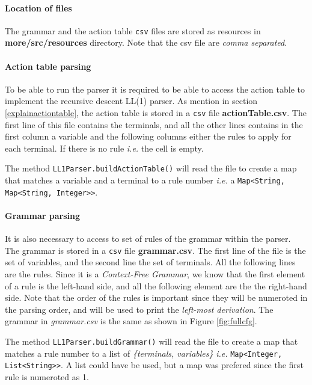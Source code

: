 \documentclass[letterpaper]{article}
\begin{document}
\paragraph{Location of files}
The grammar and the action table \texttt{csv} files are stored
as resources in
\textbf{more/src/resources} directory.
Note that the csv file are \textit{comma separated}.

\paragraph{Action table parsing}
To be able to run the parser it is required to be able to access
the action table to implement
the recursive descent LL(1) parser.
As mention in section \ref{explainactiontable}, the action table is stored
in a \texttt{csv} file \textbf{actionTable.csv}.
The first line of this file contains the
terminals, and all the other lines contains in the first column a variable
and the following columns either the rules to apply for each terminal.
If there is no rule \textit{i.e.} the cell is empty.

The method \texttt{LL1Parser.buildActionTable()} will read the file
to create a map that matches a variable and a terminal to a rule number
\textit{i.e.} a \texttt{Map<String, Map<String, Integer>>}.

\paragraph{Grammar parsing}
It is also necessary to access to set of rules of the grammar within the
parser. The grammar is stored in a \texttt{csv} file \textbf{grammar.csv}.
The first line of the file is the set of variables, and the second line
the set of terminals. All the following lines are the rules.
Since it is a \textit{Context-Free Grammar}, we know that the first element
of a rule is the left-hand side, and all the following element are the
the right-hand side.
Note that
the order of the rules is important since they will be numeroted in the parsing
order, and will be used to print the \textit{left-most derivation}.
The grammar in \textit{grammar.csv} is the same as shown in
Figure \ref{fig:fullcfg}.

The method \texttt{LL1Parser.buildGrammar()} will read the file to create
a map that matches a rule number to a list
of \textit{\{terminals, variables\}}
\textit{i.e.} \texttt{Map<Integer, List<String>>}.
A list could have be used, but a map was prefered since the first rule
is numeroted as 1.
\end{document}
